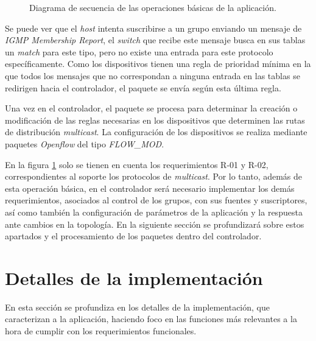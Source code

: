 \begin{figure}[th]
	\centering 
	\caption[Diagrama de secuencia simplificado de la aplicación]{Diagrama de secuencia de las operaciones básicas de la aplicación.}
	\label{fig:simple_sec_diag}
\end{figure}


Se puede ver que el \textit{host} intenta suscribirse a un grupo enviando un mensaje de \textit{IGMP Membership Report}, el \textit{switch} que recibe este mensaje busca en sus tablas un \textit{match} para este tipo, pero no existe una entrada para este protocolo específicamente. Como los dispositivos tienen una regla de prioridad mínima en la que todos los mensajes que no correspondan a ninguna entrada en las tablas se redirigen hacia el controlador, el paquete se envía según esta última regla.


Una vez en el controlador, el paquete se procesa para determinar la creación o modificación de las reglas necesarias en los dispositivos que determinen las rutas de distribución \textit{multicast}. La configuración de los dispositivos se realiza mediante paquetes \textit{Openflow} del tipo \textit{FLOW\_MOD}.


En la figura \ref{fig:simple_sec_diag} solo se tienen en cuenta los requerimientos R-01 y R-02, correspondientes al soporte los protocolos de \textit{multicast}. Por lo tanto, además de esta operación básica, en el controlador será necesario implementar los demás requerimientos, asociados al control de los grupos, con sus fuentes y suscriptores, así como también la configuración de parámetros de la aplicación y la respuesta ante cambios en la topología. En la siguiente sección se profundizará sobre estos apartados y el procesamiento de los paquetes dentro del controlador.


\section{Detalles de la implementación}

En esta sección se profundiza en los detalles de la implementación, que caracterizan a la aplicación, haciendo foco en las funciones más relevantes a la hora de cumplir con los requerimientos funcionales.\

